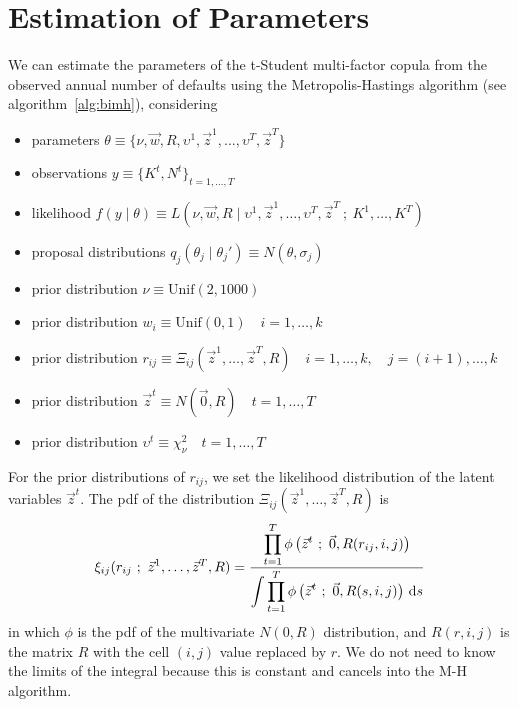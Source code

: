 \documentclass[11pt,fleqn]{book} %
\begin{document}
\section{Estimation of Parameters}

\begin{proposition}
	\label{prop:pemh}
	We can estimate the parameters of the t-Student multi-factor copula from 
	the observed annual number of defaults using the Metropolis-Hastings 
	algorithm (see algorithm~\ref{alg:bimh}), considering
	\begin{itemize}
		\item parameters $\theta \equiv \{ \nu,\vec{w},R,\upsilon^1,\vec{z}^1,\dots,\upsilon^T,\vec{z}^T\}$
		\item observations $y \equiv \{K^t, N^t\}_{t=1,\dots,T}$
		\item likelihood $f(y \mid \theta) \equiv L(\nu,\vec{w},R  \mid  \upsilon^1,\vec{z}^1,\dots,\upsilon^T,\vec{z}^T\ ;\ K^1,\dots,K^T)$
		\item proposal distributions $q_j(\theta_j \mid \theta_j') \equiv N(\theta,\sigma_j)$
		\item prior distribution $\nu \equiv \text{Unif}(2,1000)$
		\item prior distribution $w_i \equiv \text{Unif}(0,1) \quad i=1,\dots,k$
		\item prior distribution $r_{ij} \equiv \Xi_{ij}(\vec{z}^1,\dots,\vec{z}^T,R) \quad i=1,\dots,k, \quad j=(i+1),\dots,k$
		\item prior distribution $\vec{z}^t \equiv N(\vec{0},R) \quad t=1,\dots,T$
		\item prior distribution $\upsilon^t \equiv \chi_{\nu}^2 \quad t=1,\dots,T$
	\end{itemize}
	For the prior distributions of $r_{ij}$, we set the likelihood distribution
	of the latent variables $\vec{z}^t$. The pdf of the distribution 
	$\Xi_{ij}(\vec{z}^1,\dots,\vec{z}^T,R)$ is
	\begin{displaymath}
		\xi_{ij}(r_{ij}\ ;\ \vec{z}^1,\dots,\vec{z}^T,R) = \frac
		{\displaystyle \prod_{t=1}^{T} \phi\left( \vec{z}^t\ ;\ \vec{0}, R(r_{ij},i,j) \right)}
		{\displaystyle \int \prod_{t=1}^{T} \phi\left( \vec{z}^t\ ;\ \vec{0}, R(s,i,j) \right) \ud s}
	\end{displaymath}
	in which $\phi$ is the pdf of the multivariate $N(0,R)$ distribution,
	and $R(r,i,j)$ is the matrix $R$ with the cell $(i,j)$ value 
	replaced by $r$. We do not need to know the limits of the integral
	because this is constant and cancels into the M-H algorithm.
\end{proposition}
\end{document}

